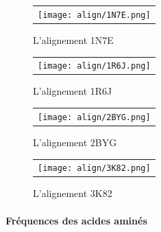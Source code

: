    \begin{figure}[t]
     \centering
     \begin{tabular}{c}
       \texttt{[image: align/1N7E.png]} \\
     \end{tabular}
     \caption{L'alignement 1N7E }
\label{graph:convEref}
   \end{figure}

    \clearpage

   \begin{figure}[t]
     \centering
     \begin{tabular}{c}
       \texttt{[image: align/1R6J.png]} \\
     \end{tabular}
     \caption{L'alignement 1R6J }
\label{graph:convEref}
   \end{figure}

    \clearpage

   \begin{figure}[t]
     \centering
     \begin{tabular}{c}
       \texttt{[image: align/2BYG.png]} \\
     \end{tabular}
     \caption{L'alignement 2BYG }
\label{graph:convEref}
   \end{figure}

    \clearpage

   \begin{figure}[t]
     \centering
     \begin{tabular}{c}
       \texttt{[image: align/3K82.png]} \\
     \end{tabular}
     \caption{L'alignement 3K82 }
\label{graph:convEref}
   \end{figure}

    \clearpage




\paragraph{Fréquences des acides aminés}


